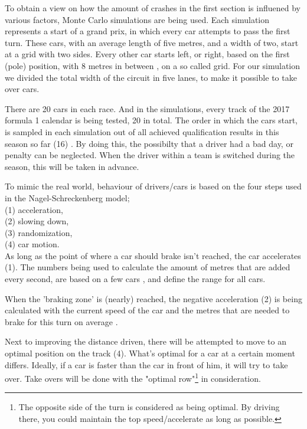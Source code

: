 To obtain a view on how the amount of crashes in the first section is influened by various factors, Monte Carlo simulations are being used. Each simulation represents a start of a grand prix, in which every car attempts to pass the first turn. These cars, with an average length of five metres, and a width of two, start at a grid with two sides. Every other car starts left, or right, based on the first (pole) position, with 8 metres in between \cite{car-regulations}, on a so called grid. For our simulation we divided the total width of the circuit in five lanes, to make it possible to take over cars.

There are 20 cars in each race. And in the simulations, every track of the 2017 formula 1 calendar is being tested, 20 in total. The order in which the cars start, is sampled in each simulation out of all achieved qualification results in this season so far (16) \cite{som}. By doing this, the possibilty that a driver had a bad day, or penalty can be neglected. When the driver within a team is switched during the season, this will be taken in advance.

To mimic the real world, behaviour of drivers/cars is based on the four steps used in the Nagel-Schreckenberg model;\\

\noindent
(1) acceleration,\\
(2) slowing down,\\
(3) randomization,\\
(4) car motion.\\

As long as the point of where a car should brake isn't reached, the car accelerates (1). The numbers being used to calculate the amount of metres that are added every second, are based on a few cars \cite{car-speeds}\cite{car-speeds-2}, and define the range for all cars.

When the 'braking zone' is (nearly) reached, the negative acceleration (2) is being calculated with the current speed of the car and the metres that are needed to brake for this turn on average \cite{som}.

Next to improving the distance driven, there will be attempted to move to an optimal position on the track (4). What's optimal for a car at a certain moment differs. Ideally, if a car is faster than the car in front of him, it will try to take over. Take overs will be done with the "optimal row"\footnote{The opposite side of the turn is considered as being optimal. By driving there, you could maintain the top speed/accelerate as long as possible.} in consideration.

